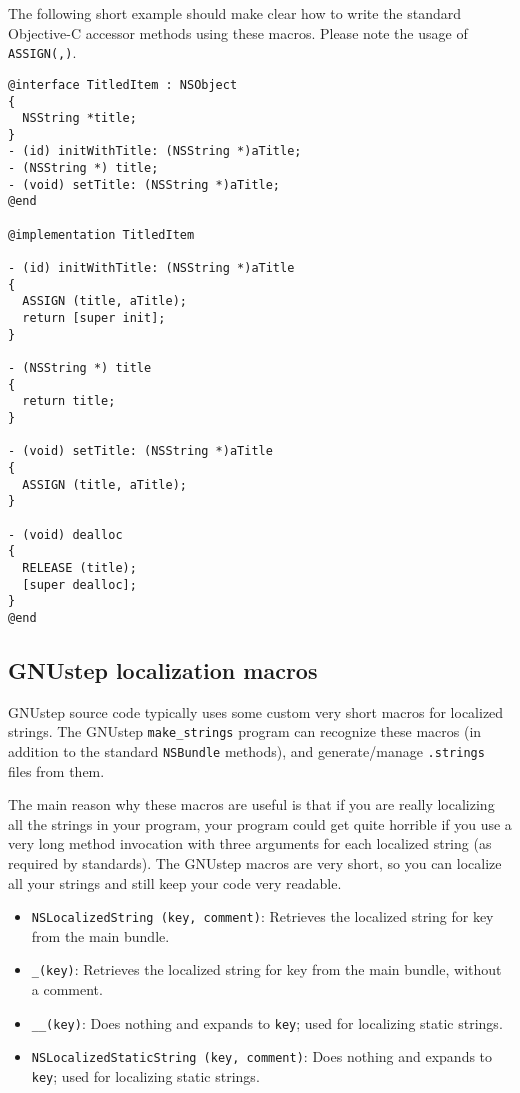 The following short example should make clear how to write the
standard Objective-C accessor methods using these macros.  Please note
the usage of \texttt{ASSIGN(,)}.
\begin{verbatim}
@interface TitledItem : NSObject
{ 
  NSString *title;
}
- (id) initWithTitle: (NSString *)aTitle;
- (NSString *) title;
- (void) setTitle: (NSString *)aTitle;
@end

@implementation TitledItem

- (id) initWithTitle: (NSString *)aTitle
{
  ASSIGN (title, aTitle);
  return [super init];
}

- (NSString *) title
{
  return title;
}

- (void) setTitle: (NSString *)aTitle
{
  ASSIGN (title, aTitle);
}

- (void) dealloc
{
  RELEASE (title);
  [super dealloc];
}
@end
\end{verbatim}

\subsection{GNUstep localization macros}
GNUstep source code typically uses some custom very short macros for
localized strings.  The GNUstep \texttt{make\_strings} program can
recognize these macros (in addition to the standard \texttt{NSBundle}
methods), and generate/manage \texttt{.strings} files from them.

The main reason why these macros are useful is that if you are really
localizing all the strings in your program, your program could get
quite horrible if you use a very long method invocation with three
arguments for each localized string (as required by standards).  The
GNUstep macros are very short, so you can localize all your strings
and still keep your code very readable.

\begin{itemize}
\item \texttt{NSLocalizedString (key, comment)}: Retrieves the 
localized string for key from the main bundle.

\item \texttt{\_(key)}: Retrieves the localized string for key from the main
bundle, without a comment.

\item \texttt{\_\_(key)}: Does nothing and expands to \texttt{key};
used for localizing static strings.

\item \texttt{NSLocalizedStaticString (key, comment)}: Does nothing and
expands to \texttt{key}; used for localizing static strings.
\end{itemize}

